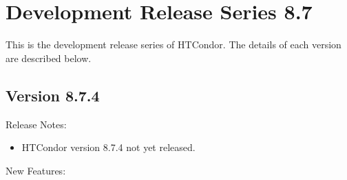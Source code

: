 
\section{\label{sec:History-8-7}Development Release Series 8.7}

This is the development release series of HTCondor.
The details of each version are described below.

\subsection*{\label{sec:New-8-7-4}Version 8.7.4}

\noindent Release Notes:

\begin{itemize}

\item HTCondor version 8.7.4 not yet released.

\end{itemize}


\noindent New Features:

